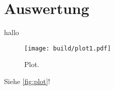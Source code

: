 \section{Auswertung}
\label{sec:Auswertung}
hallo
\begin{figure}
  \centering
  \texttt{[image: build/plot1.pdf]}
  \caption{Plot.}
  \label{fig:plot}
\end{figure}


Siehe \autoref{fig:plot}!
